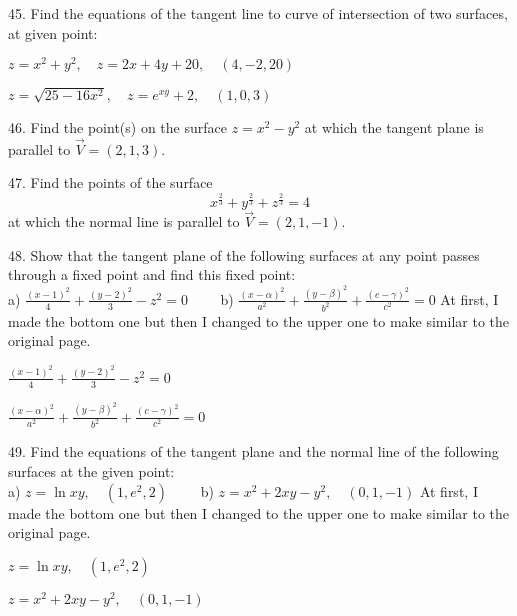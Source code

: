\documentclass[11pt]{amsbook}
\begin{document}

\begin{hEnumerateArabic}

    \item [45.] Find the equations of the tangent line to curve of intersection of two surfaces, at given point:
    \begin{hEnumerateAlpha}
        \item $z = x^{2} + y^{2}, \quad z = 2x + 4y + 20, \quad (4, -2, 20)$
        \item $z = \sqrt{25 - 16x^{2}}, \quad z = e^{xy} + 2, \quad (1, 0, 3)$
    \end{hEnumerateAlpha}
    
    \item[46.] Find the point(s) on the surface $z = x^{2} - y^{2}$ at which the tangent plane is parallel to $\vec{V} = (2, 1, 3)$.
    
    \item[47.] Find the points of the surface
    $$x^{\frac{2}{3}} + y^{\frac{2}{3}} + z^{\frac{2}{3}} = 4$$
    at which the normal line is parallel to $\vec{V} = (2, 1, -1)$.
    
    \item[48.] Show that the  tangent plane of the following surfaces at any point passes through a fixed point and find this fixed point:\\
    a) $\frac{(x-1)^{2}}{4} + \frac{(y-2)^{2}}{3} - z^{2} = 0 \qquad$
    b) $\frac{(x-\alpha)^{2}}{a^{2}} + \frac{(y-\beta)^{2}}{b^{2}} + \frac{(c-\gamma)^{2}}{c^{2}} = 0$
    \ifx
        At first, I made the bottom one but then I changed to the upper one to make similar to the original page.
        \begin{hEnumerateAlpha}
            \item $\frac{(x-1)^{2}}{4} + \frac{(y-2)^{2}}{3} - z^{2} = 0$
            \item $\frac{(x-\alpha)^{2}}{a^{2}} + \frac{(y-\beta)^{2}}{b^{2}} + \frac{(c-\gamma)^{2}}{c^{2}} = 0$
        \end{hEnumerateAlpha}
    \fi
    
    \item[49.] Find the equations of the tangent plane and the normal line of the following surfaces at the given point:\\
    a) $z = \ln{xy}, \quad (1, e^{2}, 2) \qquad$
    b) $z = x^{2} + 2xy - y^{2}, \quad (0, 1, -1)$
    \ifx
        At first, I made the bottom one but then I changed to the upper one to make similar to the original page.
        \begin{hEnumerateAlpha}
            \item $z = \ln{xy}, \quad (1, e^{2}, 2)$
            \item $z = x^{2} + 2xy - y^{2}, \quad (0, 1, -1)$
        \end{hEnumerateAlpha}
    \fi
    

\end{hEnumerateArabic}
\end{document}
